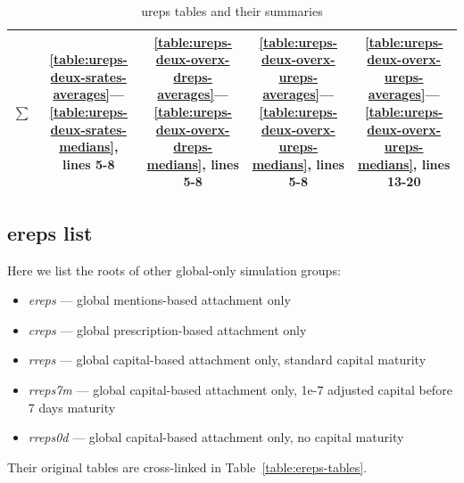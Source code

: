 \documentclass[10pt,oneside]{memoir}
\begin{document}
\begin{table}
\begin{tabular}{|ccccc|}
$\sum$ & \ref{table:ureps-deux-srates-averages}—\ref{table:ureps-deux-srates-medians}, lines 5-8 & \ref{table:ureps-deux-overx-dreps-averages}—\ref{table:ureps-deux-overx-dreps-medians}, lines 5-8 & \ref{table:ureps-deux-overx-ureps-averages}—\ref{table:ureps-deux-overx-ureps-medians}, lines 5-8 & \ref{table:ureps-deux-overx-ureps-averages}—\ref{table:ureps-deux-overx-ureps-medians}, lines 13-20 \\
\bottomrule
\end{tabular}
\caption{ureps tables and their summaries}
\label{table:ureps-tables}
\end{table}
\pagebreak \subsection{ereps list}
\label{erepslist}

Here we list the roots of other global-only simulation groups:


\begin{itemize}


\item {\itshape ereps} --- global mentions-based attachment only

\item {\itshape creps} --- global prescription-based attachment only

\item {\itshape rreps} --- global capital-based attachment only, standard capital maturity

\item {\itshape rreps7m} --- global capital-based attachment only,  1e-7 adjusted capital before 7 days maturity

\item {\itshape rreps0d} --- global capital-based attachment only, no capital maturity
\end{itemize}

Their original tables are cross-linked in Table~\ref{table:ereps-tables}.
\end{document}
